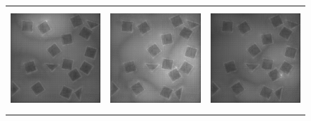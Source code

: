 \begin{figure}[t]
\begin{center}
\begin{tabular}{c c c}
            \includegraphics[width=1.5in, height=1.5in]{Counting/LaTeX/figures/putasideall/limitscaleresamplingoptionnetworkputaside/image1/touse/8-saliency.png} & \includegraphics[width=1.5in, height=1.5in]{Counting/LaTeX/figures/putasideall/limitscaleresamplingoptionnetworkputaside/image1/touse/2-saliency.png} & \includegraphics[width=1.5in, height=1.5in]{Counting/LaTeX/figures/putasideall/limitscaleresamplingoptionnetworkputaside/image1/touse/17-saliency.png} \\

\end{tabular}
\end{center}
\end{figure}
